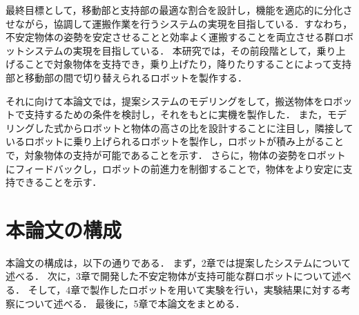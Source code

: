 最終目標として，移動部と支持部の最適な割合を設計し，機能を適応的に分化させながら，協調して運搬作業を行うシステムの実現を目指している．すなわち，不安定物体の姿勢を安定させることと効率よく運搬することを両立させる群ロボットシステムの実現を目指している．
本研究では，その前段階として，乗り上げることで対象物体を支持でき，乗り上げたり，降りたりすることによって支持部と移動部の間で切り替えられるロボットを製作する．

それに向けて本論文では，提案システムのモデリングをして，搬送物体をロボットで支持するための条件を検討し，それをもとに実機を製作した．
また，モデリングした式からロボットと物体の高さの比を設計することに注目し，隣接しているロボットに乗り上げられるロボットを製作し，ロボットが積み上がることで，対象物体の支持が可能であることを示す．
さらに，物体の姿勢をロボットにフィードバックし，ロボットの前進力を制御することで，物体をより安定に支持できることを示す．

\section{本論文の構成}
本論文の構成は，以下の通りである．
まず，2章では提案したシステムについて述べる．
次に，3章で開発した不安定物体が支持可能な群ロボットについて述べる．
そして，4章で製作したロボットを用いて実験を行い，実験結果に対する考察について述べる．
最後に，5章で本論文をまとめる．

